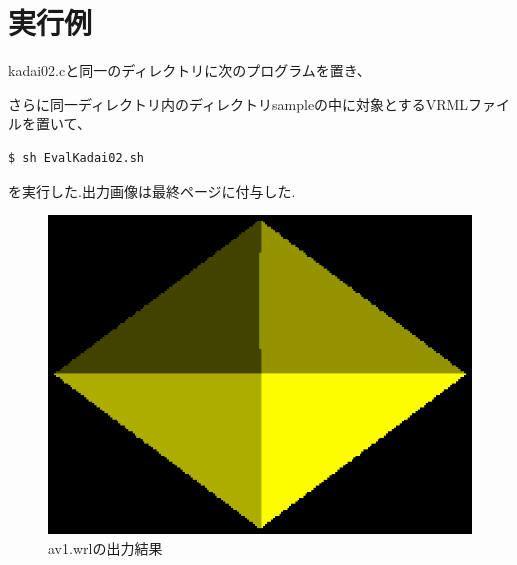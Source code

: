 \documentclass[a4j,dvipdfmx]{jsarticle}
\begin{document}
\section{実行例}
kadai02.cと同一のディレクトリに次のプログラムを置き、

さらに同一ディレクトリ内のディレクトリsampleの中に対象とするVRMLファイルを置いて、
\begin{lstlisting}
$ sh EvalKadai02.sh
\end{lstlisting}
を実行した.出力画像は最終ページに付与した.

\begin{figure}[hp]
  \begin{center}
    \includegraphics[clip,scale=0.5]{images/Kadai02ForAv1.eps}
    \caption{av1.wrlの出力結果}
    \label{av1}
  \end{center}
\end{figure}
\end{document}
